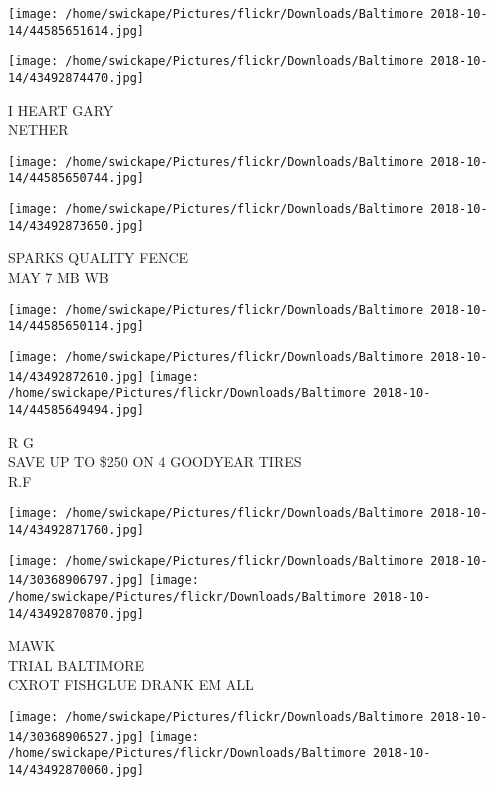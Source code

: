 \documentclass[10pt,letterpaper]{article}
\begin{document}
\texttt{[image: /home/swickape/Pictures/flickr/Downloads/Baltimore 2018-10-14/44585651614.jpg]}

\vspace{0.25in}
\texttt{[image: /home/swickape/Pictures/flickr/Downloads/Baltimore 2018-10-14/43492874470.jpg]}

I HEART GARY\\
NETHER\\
\pagebreak

\texttt{[image: /home/swickape/Pictures/flickr/Downloads/Baltimore 2018-10-14/44585650744.jpg]}

\vspace{0.25in}
\texttt{[image: /home/swickape/Pictures/flickr/Downloads/Baltimore 2018-10-14/43492873650.jpg]}

SPARKS QUALITY FENCE\\
MAY 7 MB WB\\
\pagebreak

\texttt{[image: /home/swickape/Pictures/flickr/Downloads/Baltimore 2018-10-14/44585650114.jpg]}

\vspace{0.25in}
\texttt{[image: /home/swickape/Pictures/flickr/Downloads/Baltimore 2018-10-14/43492872610.jpg]}
\texttt{[image: /home/swickape/Pictures/flickr/Downloads/Baltimore 2018-10-14/44585649494.jpg]}

R G\\
SAVE UP TO \$250 ON 4 GOODYEAR TIRES\\
R.F\\
\pagebreak

\texttt{[image: /home/swickape/Pictures/flickr/Downloads/Baltimore 2018-10-14/43492871760.jpg]}

\vspace{0.25in}
\texttt{[image: /home/swickape/Pictures/flickr/Downloads/Baltimore 2018-10-14/30368906797.jpg]}
\texttt{[image: /home/swickape/Pictures/flickr/Downloads/Baltimore 2018-10-14/43492870870.jpg]}

MAWK\\
TRIAL BALTIMORE\\
CXROT FISHGLUE DRANK EM ALL\\
\pagebreak

\texttt{[image: /home/swickape/Pictures/flickr/Downloads/Baltimore 2018-10-14/30368906527.jpg]}
\texttt{[image: /home/swickape/Pictures/flickr/Downloads/Baltimore 2018-10-14/43492870060.jpg]}
\end{document}
